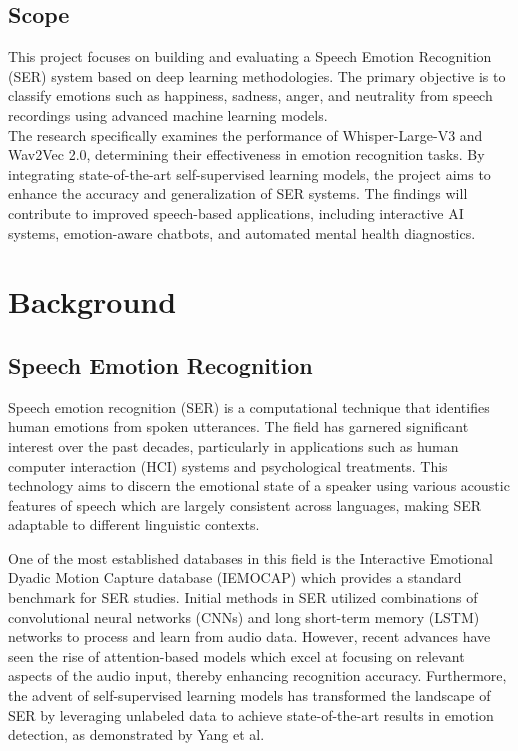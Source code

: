\documentclass[a4paper,12pt]{article}
\begin{document}
\subsection{Scope}
This project focuses on building and evaluating a Speech Emotion Recognition (SER) system based on deep learning methodologies. The primary objective is to classify emotions such as happiness, sadness, anger, and neutrality from speech recordings using advanced machine learning models.\\
The research specifically examines the performance of Whisper-Large-V3 and Wav2Vec 2.0, determining their effectiveness in emotion recognition tasks. By integrating state-of-the-art self-supervised learning models, the project aims to enhance the accuracy and generalization of SER systems. The findings will contribute to improved speech-based applications, including interactive AI systems, emotion-aware chatbots, and automated mental health diagnostics.

\newpage

\section{Background}
\subsection{Speech Emotion Recognition}
Speech emotion recognition (SER) is a computational technique that identifies human emotions from spoken utterances. The field has garnered significant interest over the past decades, particularly in applications such as human computer interaction (HCI) systems and psychological treatments. This technology aims to discern the emotional state of a speaker using various acoustic features of speech which are largely consistent across languages, making SER adaptable to different linguistic contexts.

One of the most established databases in this field is the Interactive Emotional Dyadic Motion Capture database (IEMOCAP) which provides a standard benchmark for SER studies. Initial methods in SER utilized combinations of convolutional neural networks (CNNs) and long short-term memory (LSTM) networks to process and learn from audio data. However, recent advances have seen the rise of attention-based models which excel at focusing on relevant aspects of the audio input, thereby enhancing recognition accuracy. Furthermore, the advent of self-supervised learning models has transformed the landscape of SER by leveraging unlabeled data to achieve state-of-the-art results in emotion detection, as demonstrated by Yang et al.
\end{document}
